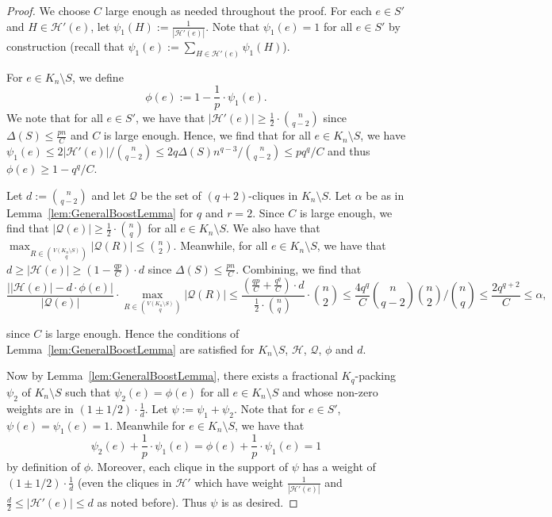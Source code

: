 \documentclass[11pt]{article}
\def\COMMENT#1{}
\numberwithin{equation}{section}
\newcommand{\mc}[1]{\mathcal{#1}}
\newcounter{i}
\theoremstyle{plain}
\theoremstyle{plain} %
\theoremstyle{definition}
\newcommand{\cH}{\mathcal{H}}
\begin{document}
\begin{proof}
We choose $C$ large enough as needed throughout the proof.
For each $e\in S'$ and $H\in \mc{H}'(e)$, let $\psi_1(H) := \frac{1}{|\mc{H}'(e)|}$. Note that $\psi_1(e) = 1$ for all $e\in S'$ by construction (recall that $\psi_1(e):= \sum_{H\in \mc{H}'(e)} \psi_1(H)$). 

For $e\in K_n\setminus S$, we define
$$\phi(e):= 1-\frac{1}{p}\cdot \psi_1(e).$$
We note that for all $e\in S'$, we have that $|\mc{H}'(e)| \ge \frac{1}{2} \cdot \binom{n}{q-2}$ since $\Delta(S)\le \frac{pn}{C}$ and $C$ is large enough. 
Hence, we find that for all $e \in K_n \setminus S$, we have $\psi_1(e) \leq 2|\cH'(e)| / \binom{n}{q - 2} \leq 2q\Delta(S)n^{q - 3} / \binom{n}{q - 2} \leq pq^q / C$\COMMENT{by the same argument in Claim~\ref{claim:fractional-concentration-codegrees-bound}\ref{fractional-concentration-better-degree-upper-bound}, we have $|\cH'(e)| \leq q\Delta(S)n^{q-3}$}
 and thus $\phi(e) \ge 1- {q^q}/{C}$. 


Let $d:=\binom{n}{q-2}$ and let $\mc{Q}$ be the set of $(q+2)$-cliques in $K_n\setminus S$. Let $\alpha$ be as in Lemma~\ref{lem:GeneralBoostLemma} for $q$ and $r=2$. Since $C$ is large enough, we find that $|\mc{Q}(e)| \ge \frac{1}{2} \cdot \binom{n}{q}$ for all $e\in K_n\setminus S$. We also have that $\max_{R\in \binom{V(K_n\setminus S)}{q}} |\mc{Q}(R)| \le \binom{n}{2}$. Meanwhile, for all $e\in K_n\setminus S$, we have that $d\ge |\mc{H}(e)|\ge (1-\frac{qp}{C})\cdot d$ since $\Delta(S)\le \frac{pn}{C}$. Combining, we find that
$$\frac{\bigg| |\mc{H}(e)|-d\cdot \phi(e) \bigg|}{|\mathcal{Q}(e)|} \cdot \max_{R\in \binom{V(K_n\setminus S)}{q}} |\mathcal{Q}(R)| \le \frac{ \left(\frac{qp}{C}+\frac{q^q}{C}\right)\cdot d}{\frac{1}{2}\cdot \binom{n}{q}} \cdot \binom{n}{2} \le \frac{4q^q}{C}\binom{n}{q - 2}\binom{n}{2} / \binom{n}{q} \leq \frac{2q^{q+2}}{C} \le \alpha,$$
\COMMENT{
\begin{equation*}
    \binom{n}{q - 2}\binom{n}{2} / \binom{n}{q} = \frac{\frac{n!}{(n - (q - 2))!(q - 2)!}\frac{n(n-1)}{2}}{\frac{n!}{(n - q)!q!}} = \frac{n(n-1)}{(n - q + 2)(n - q + 1)}\frac{q(q-1)}{2} \leq \frac{q^2}{2}
\end{equation*}
}
since $C$ is large enough. Hence the conditions of Lemma~\ref{lem:GeneralBoostLemma} are satisfied for $K_n\setminus S$, $\mc{H}$, $\mc{Q}$, $\phi$ and $d$.

Now by Lemma~\ref{lem:GeneralBoostLemma}, there exists a fractional $K_q$-packing $\psi_2$ of $K_n\setminus S$ such that $\psi_2(e)=\phi(e)$ for all $e\in K_n\setminus S$ and whose non-zero weights are in $(1\pm 1/2)\cdot \frac{1}{d}$. Let $\psi:= \psi_1+\psi_2$. Note that for $e\in S'$, $\psi(e)=\psi_1(e)=1$. Meanwhile for $e\in K_n\setminus S$, we have that 
$$\psi_2(e) +\frac{1}{p}\cdot \psi_1(e) = \phi(e)+\frac{1}{p}\cdot \psi_1(e) = 1$$ 
by definition of $\phi$. Moreover, each clique in the support of $\psi$ has a weight of $(1\pm 1/2)\cdot \frac{1}{d}$ (even the cliques in $\mc{H}'$ which have weight $\frac{1}{|\mc{H}'(e)|}$ and $\frac{d}{2}\le |\mc{H}'(e)|\le d$ as noted before). Thus $\psi$ is as desired.
\end{proof}
\end{document}
